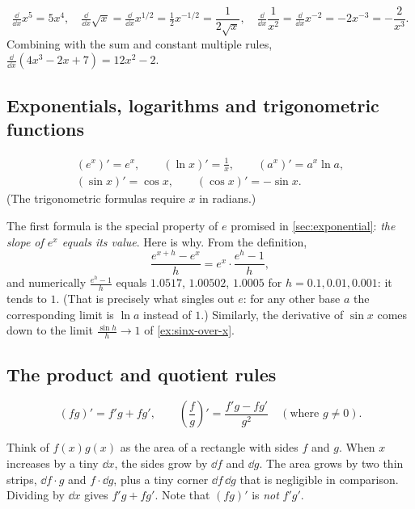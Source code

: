 \begin{example}
\[
  \tfrac{\dd}{\dd x}x^5 = 5x^4, \quad
  \tfrac{\dd}{\dd x}\sqrt{x} = \tfrac{\dd}{\dd x}x^{1/2} = \tfrac12 x^{-1/2}
  = \frac{1}{2\sqrt x}, \quad
  \tfrac{\dd}{\dd x}\frac{1}{x^2} = \tfrac{\dd}{\dd x}x^{-2} = -2x^{-3}
  = -\frac{2}{x^3}.
\]
Combining with the sum and constant multiple rules,
$\tfrac{\dd}{\dd x}(4x^3 - 2x + 7) = 12x^2 - 2$.
\end{example}

\subsection{Exponentials, logarithms and trigonometric functions}

\begin{theorem}\label{thm:special-derivatives}
\begin{gather*}
  (e^x)' = e^x, \qquad (\ln x)' = \frac1x, \qquad (a^x)' = a^x\ln a,\\
  (\sin x)' = \cos x, \qquad (\cos x)' = -\sin x .
\end{gather*}
(The trigonometric formulas require $x$ in radians.)
\end{theorem}

The first formula is the special property of $e$ promised in
\cref{sec:exponential}: \emph{the slope of $e^x$ equals its value}. Here is
why. From the definition,
\[
  \frac{e^{x+h} - e^x}{h} = e^x\cdot\frac{e^h - 1}{h},
\]
and numerically $\frac{e^h - 1}{h}$ equals $1.0517$, $1.00502$, $1.0005$ for
$h = 0.1, 0.01, 0.001$: it tends to $1$. (That is precisely what singles out
$e$: for any other base $a$ the corresponding limit is $\ln a$ instead of $1$.)
Similarly, the derivative of $\sin x$ comes down to the limit
$\frac{\sin h}{h}\to1$ of \cref{ex:sinx-over-x}.

\subsection{The product and quotient rules}

\begin{theorem}\label{thm:product-quotient}
\[
  (fg)' = f'g + fg', \qquad
  \left(\frac{f}{g}\right)' = \frac{f'g - fg'}{g^2}
  \quad (\text{where } g \neq 0).
\]
\end{theorem}

\begin{intuition}
Think of $f(x)g(x)$ as the area of a rectangle with sides $f$ and $g$. When $x$
increases by a tiny $\dd x$, the sides grow by $\dd f$ and $\dd g$. The area
grows by two thin strips, $\dd f\cdot g$ and $f\cdot\dd g$, plus a tiny corner
$\dd f\,\dd g$ that is negligible in comparison. Dividing by $\dd x$ gives
$f'g + fg'$. Note that $(fg)'$ is \emph{not} $f'g'$.
\end{intuition}

